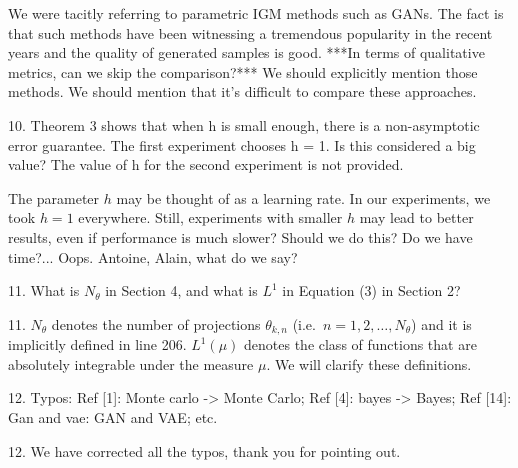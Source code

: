 \documentclass{article}
\newcommand{\rev}[1]{{\color{red} #1}}
\newcommand{\umut}[1]{{\color{blue} #1}}
\newcommand{\antoine}[1]{{\color{orange} #1}}
\begin{document}
\antoine{We were tacitly referring to parametric IGM methods such as GANs. The fact is that such methods have been witnessing a tremendous popularity in the recent years and the quality of generated samples is good. ***In terms of qualitative metrics, can we skip the comparison?***}
\umut{We should explicitly mention those methods. We should mention that it's difficult to compare these approaches.}

\rev{10. Theorem 3 shows that when h is small enough, there is a non-asymptotic error guarantee. The first experiment chooses h = 1. Is this considered a big value? The value of h for the second experiment is not provided.}

\antoine{The parameter $h$ may be thought of as a learning rate. In our experiments, we took $h=1$ everywhere. Still, experiments with smaller $h$ may lead to better results, even if performance is much slower? Should we do this? Do we have time?...}
\umut{Oops. Antoine, Alain, what do we say?}

\rev{11. What is $N_\theta$ in Section 4, and what is $L^1$ in Equation (3) in Section 2?}

11. $N_\theta$ denotes the number of projections $\theta_{k,n}$ (i.e.\ $n = 1,2,\dots, N_\theta$) and it is implicitly defined in line 206. $L^1(\mu)$ denotes the class of functions that are absolutely integrable under the measure $\mu$. We will clarify these definitions.

\rev{12. Typos: Ref [1]: Monte carlo -> Monte Carlo; Ref [4]: bayes -> Bayes; Ref [14]: Gan and vae: GAN and VAE; etc.}

12. We have corrected all the typos, thank you for pointing out.
\end{document}
